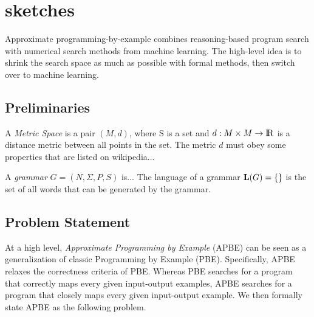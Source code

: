 \section{sketches}

Approximate programming-by-example combines reasoning-based program search with numerical search methods from machine learning.
The high-level idea is to shrink the search space as much as possible with formal methods, then switch over to machine learning.


\subsection{Preliminaries}
A \textit{Metric Space} is a pair $(M,d)$, where S is a set and $d:M \times M \to {\rm I\!R}$ is a distance metric between all points in the set. The metric $d$ must obey some properties that are listed on wikipedia...

A \textit{grammar} $G = (N,\Sigma,P,S)$ is...
The language of a grammar $\mathbf{L}(G) = \{ \}$ is the set of all words that can be generated by the grammar.


\subsection{Problem Statement}
At a high level, \textit{Approximate Programming by Example} (APBE) can be seen as a generalization of classic Programming by Example (PBE).
Specifically, APBE relaxes the correctness criteria of PBE.
Whereas PBE searches for a program that correctly maps every given input-output examples, APBE searches for a program that closely maps every given input-output example.
We then formally state APBE as the following problem.


